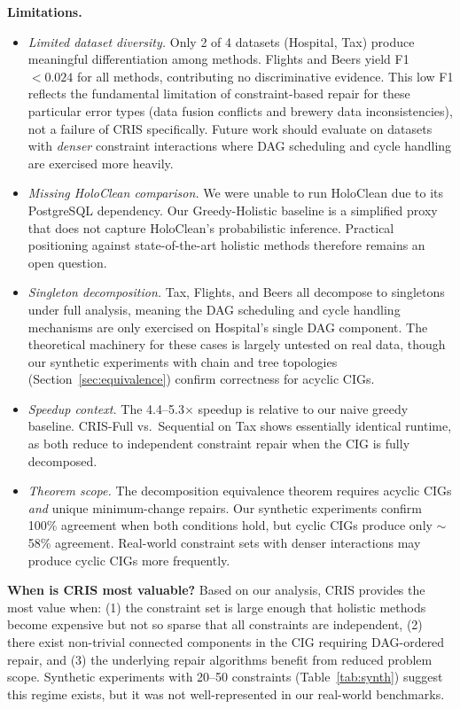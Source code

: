 \documentclass{article}
\newcommand{\cris}{\textsc{CRIS}\xspace}
\begin{document}
\textbf{Limitations.}
\begin{itemize}
  \item \emph{Limited dataset diversity.} Only 2 of 4 datasets (Hospital, Tax) produce meaningful differentiation among methods. Flights and Beers yield F1 $< 0.024$ for all methods, contributing no discriminative evidence. This low F1 reflects the fundamental limitation of constraint-based repair for these particular error types (data fusion conflicts and brewery data inconsistencies), not a failure of \cris specifically. Future work should evaluate on datasets with \emph{denser} constraint interactions where DAG scheduling and cycle handling are exercised more heavily.
  \item \emph{Missing HoloClean comparison.} We were unable to run HoloClean due to its PostgreSQL dependency. Our Greedy-Holistic baseline is a simplified proxy that does not capture HoloClean's probabilistic inference. Practical positioning against state-of-the-art holistic methods therefore remains an open question.
  \item \emph{Singleton decomposition.} Tax, Flights, and Beers all decompose to singletons under full analysis, meaning the DAG scheduling and cycle handling mechanisms are only exercised on Hospital's single DAG component. The theoretical machinery for these cases is largely untested on real data, though our synthetic experiments with chain and tree topologies (Section~\ref{sec:equivalence}) confirm correctness for acyclic CIGs.
  \item \emph{Speedup context.} The 4.4--5.3$\times$ speedup is relative to our naive greedy baseline. \cris-Full vs.\ Sequential on Tax shows essentially identical runtime, as both reduce to independent constraint repair when the CIG is fully decomposed.
  \item \emph{Theorem scope.} The decomposition equivalence theorem requires acyclic CIGs \emph{and} unique minimum-change repairs. Our synthetic experiments confirm 100\% agreement when both conditions hold, but cyclic CIGs produce only $\sim$58\% agreement. Real-world constraint sets with denser interactions may produce cyclic CIGs more frequently.
\end{itemize}

\textbf{When is \cris most valuable?} Based on our analysis, \cris provides the most value when: (1) the constraint set is large enough that holistic methods become expensive but not so sparse that all constraints are independent, (2) there exist non-trivial connected components in the CIG requiring DAG-ordered repair, and (3) the underlying repair algorithms benefit from reduced problem scope. Synthetic experiments with 20--50 constraints (Table~\ref{tab:synth}) suggest this regime exists, but it was not well-represented in our real-world benchmarks.
\end{document}
